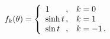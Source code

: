 \begin{equation}
f_k(\theta) = \left\{\begin{array}{l@{\,,\quad}l}
                     1 & k=0 \\ \sinh t & k = 1 \\ \sin t & k = -1\,.
                     \end{array} \right.
\end{equation}

